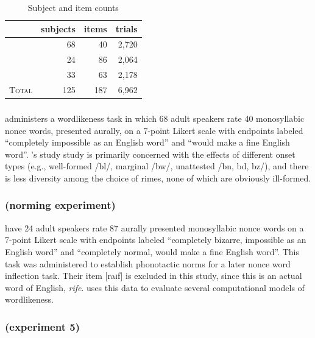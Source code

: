 \begin{table}
\centering
\begin{tabular}{l rrr}
\toprule
                           & subjects & items & trials \\
\midrule
\citeauthor{Albright2007}  & 68       & 40    & 2,720  \\
\citeauthor{Albright2003b} & 24       & 86    & 2,064  \\
\citeauthor{Scholes1966}   & 33       & 63    & 2,178  \\
\midrule
\textsc{Total}             & 125      & 187   & 6,962  \\
\bottomrule
\end{tabular}
\caption{Subject and item counts}
\label{counts}
\end{table}

\subsubsection{\citealt{Albright2007}}

\citet{Albright2007} administers a wordlikeness task in which 68 adult speakers rate 40 monosyllabic nonce words, presented aurally, on a 7-point Likert scale with endpoints labeled  ``completely impossible as an English word'' and ``would make a fine English word''. \citealt{Albright2007}'s study study is primarily concerned with the effects of different onset types (e.g., well-formed /bl/, marginal /bw/, unattested /bn, bd, bz/), and there is less diversity among the choice of rimes, none of which are obviously ill-formed.

\subsubsection{\citealt{Albright2003b} (norming experiment)}

\citet{Albright2003b} have 24 adult speakers rate 87 aurally presented monosyllabic nonce words on a 7-point Likert scale with endpoints labeled ``completely bizarre, impossible as an English word'' and ``completely normal, would make a fine English word''. This task was administered to establish phonotactic norms for a later nonce word inflection task. Their item [raɪf] is excluded in this study, since this is an actual word of English, \emph{rife}. \citet{Albright2009a} uses this data to evaluate several computational models of wordlikeness.

\subsubsection{\citealt{Scholes1966} (experiment 5)}

